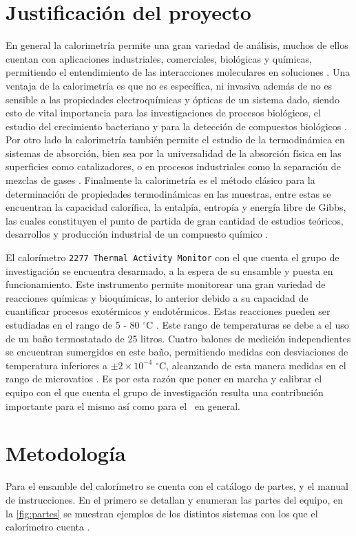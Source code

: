 \section{Justificación del proyecto}
	En general la calorimetría permite una gran variedad de análisis, muchos de ellos cuentan con aplicaciones industriales, comerciales, biológicas y químicas, permitiendo el entendimiento de las interacciones moleculares en soluciones \cite{blandamer1998titration}. Una ventaja de la calorimetría es que no es específica, ni invasiva además de no es sensible a las propiedades electroquímicas y ópticas de un sistema dado, siendo esto de vital importancia para las investigaciones de procesos biológicos, el estudio del crecimiento bacteriano y para la detección de compuestos biológicos \cite{winkelmann2004application}. Por otro lado la calorimetría también permite el estudio de la termodinámica en sistemas de absorción, bien sea por la universalidad de la absorción física en las superficies como catalizadores, o en procesos industriales como la separación de mezclas de gases \cite{morrison1987calorimetry}. Finalmente la calorimetría es el método clásico para la determinación de propiedades termodinámicas en las muestras, entre estas se encuentran la capacidad calorífica, la entalpía, entropía y energía libre de Gibbs, las cuales constituyen el punto de partida de gran cantidad de estudios teóricos, desarrollos y producción industrial de un compuesto químico \cite{wang2005determination, gaisford2016principles}.

	El calorímetro \texttt{2277 Thermal Activity Monitor} con el que cuenta el grupo de investigación se encuentra desarmado, a la espera de su ensamble y puesta en funcionamiento. Este instrumento permite monitorear una gran variedad de reacciones químicas y bioquímicas, lo anterior debido a su capacidad de cuantificar procesos exotérmicos y endotérmicos. Estas reacciones pueden ser estudiadas en el rango de 5 - 80 $^\circ$C \cite{Suurkuusk}. Este rango de temperaturas se debe a el uso de un baño termostatado de 25 litros. Cuatro balones de medición independientes se encuentran sumergidos en este baño, permitiendo medidas con desviaciones de temperatura inferiores a $\pm2\times10^{-4}$ $^\circ$C, alcanzando de esta manera medidas en el rango de microvatios \cite{Suurkuusk}. Es por esta razón que poner en marcha y calibrar el equipo con el que cuenta el grupo de investigación resulta una contribución importante para el mismo así como para el \deptname\ en general.
	
\section{Metodología}
	Para el ensamble del calorímetro se cuenta con el catálogo de partes, y el manual de instrucciones. En el primero se detallan y enumeran las partes del equipo, en la \autoref{fig:partes} se muestran ejemplos de los distintos sistemas con los que el calorímetro cuenta \cite{Suurkuusk}. 
	
